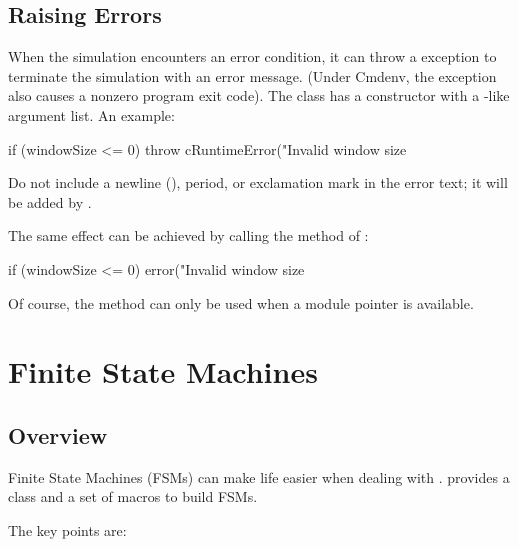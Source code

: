 \subsection{Raising Errors}
\label{sec:simple-modules:raising-errors}

When the simulation encounters an error condition, it can throw a
 exception to terminate the simulation with an error
message. (Under Cmdenv, the exception also causes a nonzero program exit
code). The  class has a constructor with a
-like argument list. An example:

\begin{cpp}
if (windowSize <= 0)
    throw cRuntimeError("Invalid window size %
\end{cpp}

Do not include a newline (), period, or exclamation mark
in the error text; it will be added by {\opp}.

The same effect can be achieved by calling the  method of
:

\begin{cpp}
if (windowSize <= 0)
    error("Invalid window size %
\end{cpp}

Of course, the  method can only be used when a module pointer
is available.



\section{Finite State Machines}
\label{sec:simple-modules:fsm}

\subsection{Overview}
\label{sec:simple-modules:fsm-overview}

Finite State Machines (FSMs)
can make life easier when dealing with . {\opp} provides a
class and a set of macros to build FSMs.

The key points are:

